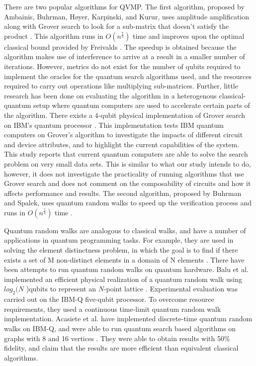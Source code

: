 \documentclass[11pt]{article}
\theoremstyle{definition}
\theoremstyle{remark}
\begin{document}
There are two popular algorithms for QVMP. The first algorithm, proposed by
Ambainis, Buhrman, Høyer, Karpinski, and Kurur, uses amplitude amplification
along with Grover search to look for a sub-matrix that doesn’t satisfy the
product \cite{ambainis2002quantummatrix}. This algorithm runs in
$O(n^{\frac{7}{3}})$ time and improves upon the optimal classical bound provided
by Freivalds \cite{freivalds1979fast}. The speedup is obtained because the
algorithm makes use of interference to arrive at a result in a smaller number of
iterations. However, metrics do not exist for the number of qubits required to
implement the oracles for the quantum search algorithms used, and the resources
required to carry out operations like multiplying sub-matrices.  Further, little
research has been done on evaluating the algorithm in a heterogenous
classical-quantum setup where quantum computers are used to accelerate certain
parts of the algorithm. There exists a 4-qubit physical implementation of Grover
search on IBM’s quantum processor \cite{mandviwalla2018implementing}. This
implementation tests IBM quantum computers on Grover’s algorithm to investigate
the impacts of different circuit and device attributes, and to highlight the
current capabilities of the system.  This study reports that current quantum
computers are able to solve the search problem on very small data sets. This is
similar to what our study intends to do, however, it does not investigate the
practicality of running algorithms that use Grover search and does not comment
on the composability of circuits and how it affects performance and results. The
second algorithm, proposed by Buhrman and Spalek, uses quantum random walks to
speed up the verification process and runs in $O(n^\frac{5}{3})$ time
\cite{buhrman2005quantum}.

Quantum random walks are analogous to classical walks, and have a number of
applications in quantum programming tasks. For example, they are used in solving
the element distinctness problem, in which the goal is to find if there exists a
set of M non-distinct elements in a domain of N elements
\cite{ambainis2007quantumwalk}. There have been attempts to run quantum random
walks on quantum hardware. Balu et al.  implemented an efficient physical
realization of a quantum random walk using $log_2(N$ )qubits to represent an
$N$-point lattice \cite{balu2018physical}.  Experimental evaluation was
carried out on the IBM-Q five-qubit processor. To overcome resource
requirements, they used a continuous time-limit quantum random walk
implementation. Acasiete et al. have implemented discrete-time quantum random
walks on IBM-Q, and were able to run quantum search based algorithms on graphs
with 8 and 16 vertices \cite{acasiete2020implementation}. They were able to
obtain results with 50\% fidelity, and claim that the results are more efficient
than equivalent classical algorithms.
\end{document}

